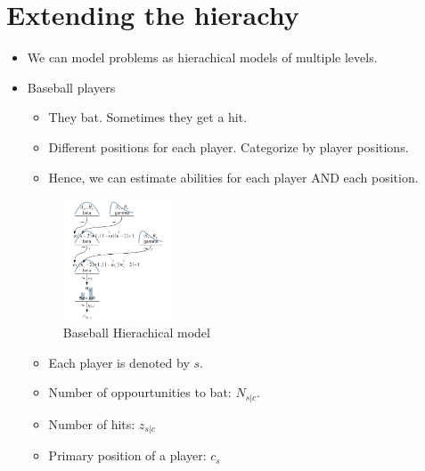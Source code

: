 \documentclass{article}
\begin{document}
    \section{Extending the hierachy}
    \begin{itemize}
        \item We can model problems as hierachical models of multiple levels.
        \item Baseball players
            \begin{itemize}
                \item They bat. Sometimes they get a hit. 
                \item Different positions for each player. Categorize by player positions.
                \item Hence, we can estimate abilities for each player AND each position.
            \end{itemize}
        \begin{figure}[H]
            \centering
            \includegraphics[width=0.3\textwidth]{baseball_model}
            \caption{Baseball Hierachical model}
            \label{fig:}
        \end{figure}
        \begin{itemize}
            \item Each player is denoted by $s$.
            \item Number of oppourtunities to bat: $N_{s|c}$.
            \item Number of hits: $z_{s|c}$
            \item Primary position of a player:  $c_{s}$
        \end{itemize}
    \end{itemize}
\end{document}
